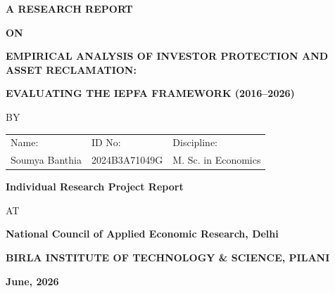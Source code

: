 \documentclass[openany]{book}
\begin{document}


\large

\thispagestyle{empty}
\centerline{\bf A RESEARCH REPORT}
\vspace*{0.3cm}
\centerline{\bf ON}
\vspace*{0.3cm}
\centerline{\bf EMPIRICAL ANALYSIS OF INVESTOR PROTECTION AND ASSET RECLAMATION:}
\centerline{\bf EVALUATING THE IEPFA FRAMEWORK (2016--2026)}
\vspace*{2cm}

\centerline{BY}
\vspace*{1cm}

\begin{center}
	\begin{tabular}{lll}
		Name: & \hspace*{2cm} ID No: & \hspace*{2cm} Discipline: \\ 
		Soumya Banthia &\hspace*{2cm} 2024B3A71049G &\hspace*{2cm} M. Sc. in Economics \\
	\end{tabular}
\end{center}

\vspace*{2cm}
\begin{center}
	{\bf Individual Research Project Report}
\end{center}

\vspace*{0.5cm}

\centerline{AT}

\vspace*{1cm}
        \centerline{\bf National Council of Applied Economic Research, Delhi}
	\vspace{0.5cm}
\begin{figure}[ht]
\epsfxsize=1.0in
\centerline{}
\end{figure}

	\centerline{\bf BIRLA INSTITUTE OF TECHNOLOGY \& SCIENCE, PILANI}
	\vspace*{0.5cm}
	\centerline{\bf June, 2026}
	\newpage

\thispagestyle{empty}
\end{document}
